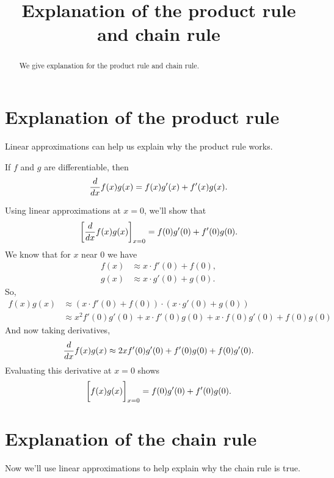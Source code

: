 \documentclass{ximera}
\title[Dig-In:]{Explanation of the product rule and chain rule}
\begin{document}
\begin{abstract}
  We give explanation for the product rule and chain rule.
\end{abstract}
\maketitle


\section{Explanation of the product rule}

Linear approximations can help us explain why the product rule works.

\begin{theorem}
If $f$ and $g$ are differentiable, then
\[
\frac{d}{dx} f(x)g(x) = f(x)g'(x)+f'(x)g(x).
\]

\begin{explanation}
  Using linear approximations at $x=0$, we'll show that
  \[
  \bigg[ \frac{d}{dx} f(x)g(x) \bigg]_{x=0} = f(0)g'(0)+f'(0)g(0).
  \]
  We know that for $x$ near $0$ we have
  \begin{align*}
    f(x) &\approx x\cdot f'(0) + f(0),\\
    g(x) &\approx x\cdot g'(0) + g(0).
  \end{align*}
  So,
  \begin{align*}
    f(x)g(x) &\approx (x\cdot f'(0) + f(0))\cdot (x\cdot g'(0) + g(0))\\
    &\approx x^2f'(0)g'(0) +x\cdot f'(0)g(0) + x\cdot f(0)g'(0)  + f(0)g(0)
  \end{align*}
  And now taking derivatives,
  \[
  \frac{d}{dx} f(x)g(x) \approx 2xf'(0)g'(0) +f'(0)g(0) + f(0)g'(0).
  \]
  Evaluating this derivative at $x=0$ shows
  \[
  \bigg[ f(x)g(x) \bigg]_{x=0}= f(0)g'(0)+f'(0)g(0).
  \]
\end{explanation}
\end{theorem}    



\section{Explanation of the chain rule}

Now we'll use linear approximations to help explain why the chain rule
is true.
\end{document}
